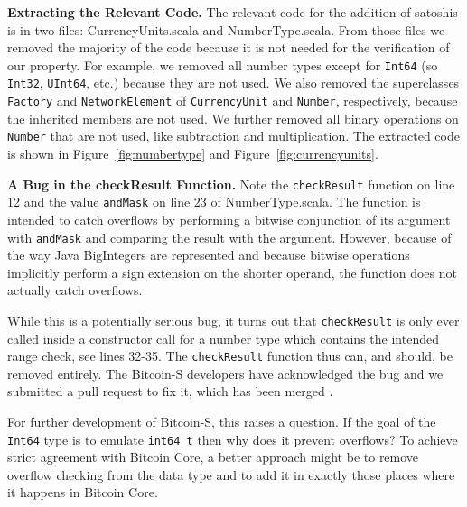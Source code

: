 \documentclass[hyphens, a4paper,USenglish,cleveref, autoref, thm-restate]{oasics-v2019}
\renewcommand{\paragraph}{\textbf}%
\begin{document}
\paragraph{Extracting the Relevant Code.} The relevant code for the
addition of satoshis is in two files: CurrencyUnits.scala and
NumberType.scala. From those files we removed the majority of the code
because it is not needed for the verification of our property. For
example, we removed all number types except for \texttt{Int64} (so
\texttt{Int32}, \texttt{UInt64}, etc.) because they are not used. We
also removed the superclasses \texttt{Factory} and
\texttt{NetworkElement} of \texttt{CurrencyUnit} and \texttt{Number},
respectively, because the inherited members are not used. We further
removed all binary operations on \texttt{Number} that are not used,
like subtraction and multiplication. The extracted code is shown in
Figure~\ref{fig:numbertype} and Figure~\ref{fig:currencyunits}.

\paragraph{A Bug in the checkResult Function.} Note the
\texttt{checkResult} function on line 12 and the value
\texttt{andMask} on line 23 of NumberType.scala. The function is
intended to catch overflows by performing a bitwise conjunction of its
argument with \texttt{andMask} and comparing the result with the
argument. However, because of the way Java BigIntegers are represented
\cite{wikipedia:twocomp} and because bitwise operations implicitly
perform a sign extension \cite{java:bigint} on the shorter operand,
the function does not actually catch overflows.

While this is a potentially serious bug, it turns out that
\texttt{checkResult} is only ever called inside a constructor call for
a number type which contains the intended range check, see lines
32-35. The \texttt{checkResult} function thus can, and should, be
removed entirely. The Bitcoin-S developers have acknowledged the bug
and we submitted a pull request to fix it, which has been merged
\cite{BitcoinS:pull565}.

For further development of Bitcoin-S, this raises a question. If the
goal of the \texttt{Int64} type is to emulate \texttt{int64\_t} then
why does it prevent overflows? To achieve strict agreement with
Bitcoin Core, a better approach might be to remove overflow checking
from the data type and to add it in exactly those places where it
happens in Bitcoin Core.
\end{document}
